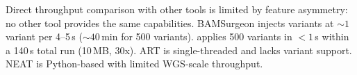 Direct throughput comparison with other tools is limited by feature asymmetry: no other tool provides the same capabilities.
BAMSurgeon injects variants at ${\sim}1$ variant per 4--5\,s (${\sim}40$\,min for 500 variants).
\varforge{} applies 500 variants in $<1$\,s within a 140\,s total run (10\,MB, 30x).
ART is single-threaded and lacks variant support.
NEAT is Python-based with limited WGS-scale throughput.
